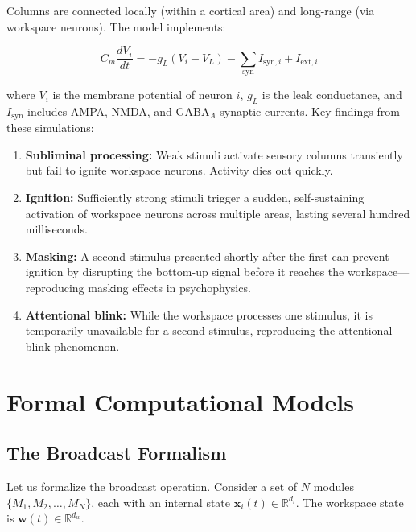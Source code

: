 \documentclass[11pt,a4paper]{report}
\begin{document}
Columns are connected locally (within a cortical area) and long-range (via workspace neurons). The model implements:

\[
  C_m \frac{dV_i}{dt} = -g_L(V_i - V_L) - \sum_{\text{syn}} I_{\text{syn},i} + I_{\text{ext},i}
\]

where $V_i$ is the membrane potential of neuron $i$, $g_L$ is the leak conductance, and $I_{\text{syn}}$ includes AMPA, NMDA, and GABA$_A$ synaptic currents. Key findings from these simulations:

\begin{predbox}
\begin{enumerate}[leftmargin=1.5em]
  \item \textbf{Subliminal processing:} Weak stimuli activate sensory columns transiently but fail to ignite workspace neurons. Activity dies out quickly.
  \item \textbf{Ignition:} Sufficiently strong stimuli trigger a sudden, self-sustaining activation of workspace neurons across multiple areas, lasting several hundred milliseconds.
  \item \textbf{Masking:} A second stimulus presented shortly after the first can prevent ignition by disrupting the bottom-up signal before it reaches the workspace---reproducing masking effects in psychophysics.
  \item \textbf{Attentional blink:} While the workspace processes one stimulus, it is temporarily unavailable for a second stimulus, reproducing the attentional blink phenomenon.
\end{enumerate}
\end{predbox}


\chapter{Formal Computational Models}

\section{The Broadcast Formalism}

Let us formalize the broadcast operation. Consider a set of $N$ modules $\{M_1, M_2, \ldots, M_N\}$, each with an internal state $\mathbf{x}_i(t) \in \mathbb{R}^{d_i}$. The workspace state is $\mathbf{w}(t) \in \mathbb{R}^{d_w}$.
\end{document}
